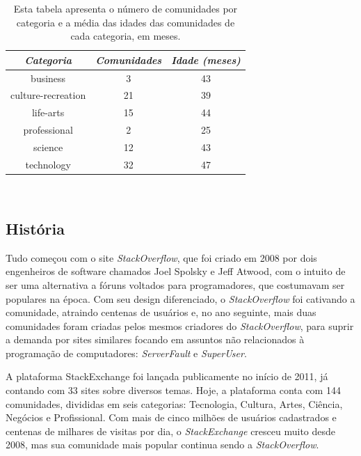 \begin{table}[h]
\centering
\begin{tabular}{@{}ccc@{}}
\toprule
{\small\textit{Categoria}} & {\small \textit{Comunidades}} & {\small \textit{Idade (meses)}} \\ \midrule
business           & 3  & 43 \\
culture-recreation & 21 & 39 \\
life-arts          & 15 & 44 \\
professional       & 2  & 25 \\
science            & 12 & 43 \\
technology         & 32 & 47 \\ \bottomrule
\end{tabular}
\caption[Resumo das categorias do \emph{StackExchange}]{Esta tabela apresenta o número de comunidades por categoria e a média das idades das comunidades de cada categoria, em meses.}~\label{table:categories}
\end{table}

\subsection{História} %
\label{sub:hist_ria}

Tudo começou com o site \emph{StackOverflow}, que foi criado em 2008 por dois engenheiros de software chamados Joel Spolsky e Jeff Atwood, com o intuito de ser uma alternativa a fóruns voltados para programadores, que costumavam ser populares na época. Com seu design diferenciado, o \emph{StackOverflow} foi cativando a comunidade, atraindo centenas de usuários e, no ano seguinte, mais duas comunidades foram criadas pelos mesmos criadores do \emph{StackOverflow}, para suprir a demanda por sites similares focando em assuntos não relacionados à programação de computadores: \emph{ServerFault} e \emph{SuperUser}.

A plataforma StackExchange foi lançada publicamente no início de 2011, já contando com 33 sites sobre diversos temas. Hoje, a plataforma conta com 144 comunidades, divididas em seis categorias: Tecnologia, Cultura, Artes, Ciência, Negócios e Profissional. Com mais de cinco milhões de usuários cadastrados e centenas de milhares de visitas por dia, o \emph{StackExchange} cresceu muito desde 2008, mas sua comunidade mais popular continua sendo a \emph{StackOverflow}.


